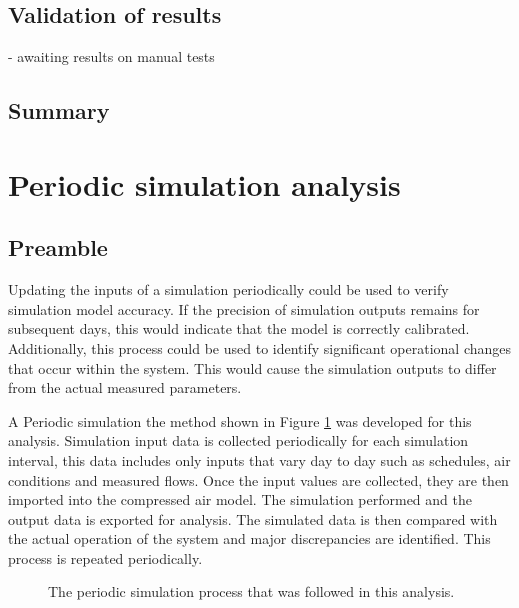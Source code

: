 	
	\subsection{Validation of results}
	
	- awaiting results on manual tests
	
	\subsection{Summary}
\newpage
\section{Periodic simulation analysis}
	\subsection{Preamble}
	Updating the inputs of a simulation periodically could be used to verify simulation model accuracy. If the precision of simulation outputs remains for subsequent days, this would indicate that the model is correctly calibrated. Additionally, this process could be used to identify significant operational changes that occur within the system. This would cause the simulation outputs to differ from the actual measured parameters. 
	\par 
	A Periodic simulation the method shown in Figure \ref{fig: PeriodicProcess} was developed for this analysis. Simulation input data is collected periodically for each simulation interval, this data includes only inputs that vary day to day such as schedules, air conditions and  measured flows. Once the input values are collected, they are then imported into the compressed air model. The simulation performed and the output data is exported for analysis. The  simulated data is then compared with the actual operation of the system and major discrepancies are identified. This process is repeated periodically.
		\begin{figure}[h]
		\centering
		\caption{The periodic simulation process that was followed in this analysis.}
		\label{fig: PeriodicProcess}
		\end{figure}	
